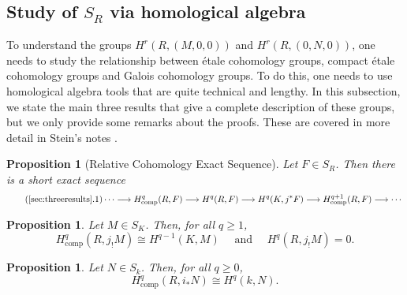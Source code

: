 \documentclass{article}
\newcommand{\comp}{\mathrm{comp}}
\theoremstyle{plain}
\newtheorem{proposition}[theorem]{Proposition}
\theoremstyle{definition}
\begin{document}
    \subsection{Study of \texorpdfstring{$S_R$}{TEXT} via homological algebra}\label{sec:threeresults}

    To understand the groups $H^r(R,(M,0,0))$ and $H^r(R,(0,N,0))$, one needs to study the relationship between \'{e}tale cohomology groups, compact \'{e}tale cohomology groups and Galois cohomology groups. To do this, one needs to use homological algebra tools that are quite technical and lengthy. In this subsection, we state the main three results that give a complete description of these groups, but we only provide some remarks about the proofs. These are covered in more detail in Stein's notes \cite[Propositions 27.3, 27.4, 27.5]{Stein}.

    \begin{proposition}[Relative Cohomology Exact Sequence]\label{prop:relcoh}
        Let $F\in S_R$. Then there is a short exact sequence
        \begin{equation}\label{eqn:relativeseq}\tag{\ref{sec:threeresults}.1}
            \cdots\longrightarrow H^q_{\comp}(R,F)\longrightarrow H^q(R,F)\longrightarrow H^q(K,j^*F)\longrightarrow H^{q+1}_{\comp}(R,F)\longrightarrow\cdots    
        \end{equation}
    \end{proposition}
    \begin{proposition}\label{prop:HqM}
        Let $M\in S_K$. Then, for all $q\geq 1$,
        $$H^q_{\comp}(R,j_!M)\cong H^{q-1}(K,M)\quad\text{ and }\quad H^q(R,j_!M)=0.$$        
    \end{proposition}
    \begin{proposition}\label{prop:HqN}
        Let $N\in S_k$. Then, for all $q\geq 0$,
        $$H^q_{\comp}(R,i_*N)\cong H^q(k,N).$$
    \end{proposition}
\end{document}
